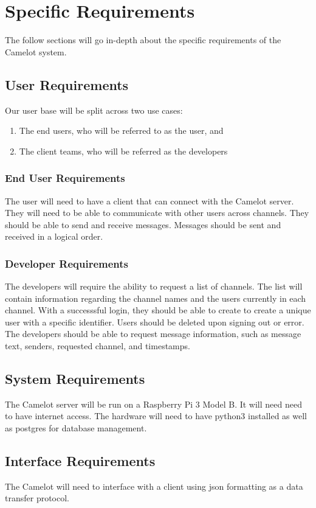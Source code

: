 \chapter{Specific Requirements}\label{specific-requirements}
The follow sections will go in-depth about the specific requirements of the Camelot system.

\section{User Requirements}\label{user-requirements}
Our user base will be split across two use cases:

\begin{enumerate}
    \item The end users, who will be referred to as the user, and
    \item The client teams, who will be referred as the developers
\end{enumerate}

\subsection{End User Requirements}\label{user-requirements-1}
The user will need to have a client that can connect with the Camelot
server. They will need to be able to communicate with other users across
channels. They should be able to send and receive messages. Messages
should be sent and received in a logical order.

\subsection{Developer Requirements}\label{developer-requirements}
The developers will require the ability to request a list
of channels. The list will contain information regarding the channel
names and the users currently in each channel. With a successsful login,
they should be able to create to create a unique user with a specific
identifier. Users should be deleted upon signing out or error. The
developers should be able to request message information, such as
message text, senders, requested channel, and timestamps.

\section{System Requirements}\label{system-requirements}
The Camelot server will be run on a Raspberry Pi 3 Model B. It will need
need to have internet access. The hardware will need to have \gls{python}3
installed as well as \gls{postgres} for database management.

\section{Interface Requirements}\label{interface-requirements}
The Camelot will need to interface with a client using \gls{json} formatting
as a data transfer protocol.
